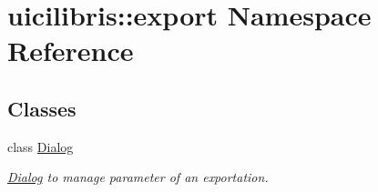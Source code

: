 \hypertarget{namespaceuicilibris_1_1export}{\section{uicilibris\-:\-:export \-Namespace \-Reference}
\label{namespaceuicilibris_1_1export}
}
\subsection*{\-Classes}
\begin{DoxyCompactItemize}
\item 
class \hyperlink{classuicilibris_1_1export_1_1Dialog}{\-Dialog}
\begin{DoxyCompactList}\small\item\em \hyperlink{classuicilibris_1_1export_1_1Dialog}{\-Dialog} to manage parameter of an exportation. \end{DoxyCompactList}\end{DoxyCompactItemize}
